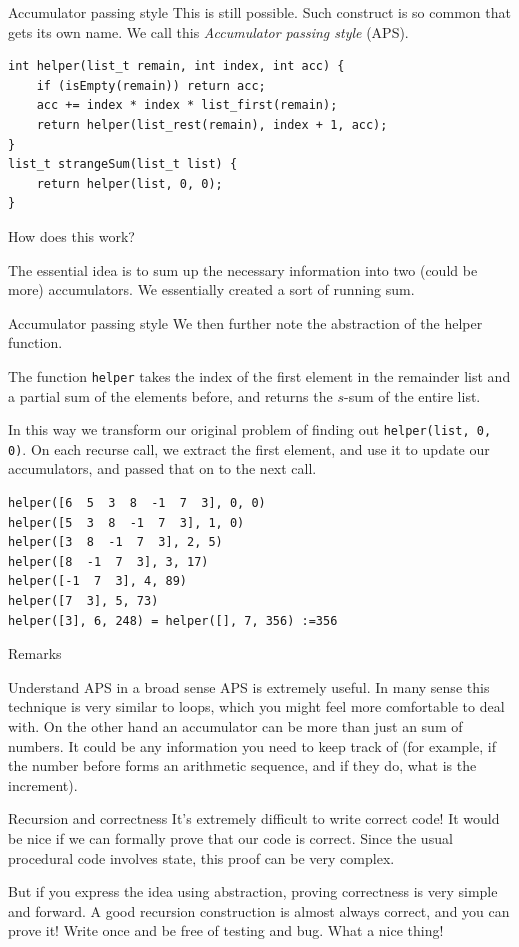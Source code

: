 \begin{frame}[fragile]{Accumulator passing style}
This is still possible. Such construct is so common that gets its own name. We call this \textit{Accumulator passing style} (APS). 

\begin{verbatim}
int helper(list_t remain, int index, int acc) {
    if (isEmpty(remain)) return acc;
    acc += index * index * list_first(remain);
    return helper(list_rest(remain), index + 1, acc);
}
list_t strangeSum(list_t list) { 
    return helper(list, 0, 0); 
}
\end{verbatim}

How does this work? 

The essential idea is to sum up the necessary information into two (could be more) accumulators. We essentially created a sort of running sum.
\end{frame}

\begin{frame}[fragile]{Accumulator passing style}
We then further note the abstraction of the helper function.

The function \texttt{helper} takes the index of the first element in the remainder list and a partial sum of the elements before, and returns the $s$-sum of the entire list.

In this way we transform our original problem of finding out \texttt{helper(list, 0, 0)}. On each recurse call, we extract the first element, and use it to update our accumulators, and passed that on to the next call. 

\begin{verbatim}
helper([6  5  3  8  -1  7  3], 0, 0)
helper([5  3  8  -1  7  3], 1, 0)
helper([3  8  -1  7  3], 2, 5)
helper([8  -1  7  3], 3, 17)
helper([-1  7  3], 4, 89)
helper([7  3], 5, 73)
helper([3], 6, 248) = helper([], 7, 356) :=356
\end{verbatim}
\end{frame}

\begin{frame}{Remarks}
\begin{block}{Understand APS in a broad sense}
	APS is extremely useful. In many sense this technique is very similar to loops, which you might feel more comfortable to deal with. On the other hand an accumulator can be more than just an sum of numbers. It could be any information you need to keep track of (for example, if the number before forms an arithmetic sequence, and if they do, what is the increment). 
\end{block}

\begin{block}{Recursion and correctness}
	It's extremely difficult to write correct code! It would be nice if we can formally prove that our code is correct. Since the usual procedural code involves state, this proof can be very complex. 
	
	But if you express the idea using abstraction, proving correctness is very simple and forward. A good recursion construction is almost always correct, and you can prove it! Write once and be free of testing and bug. What a nice thing!
\end{block}
\end{frame}
